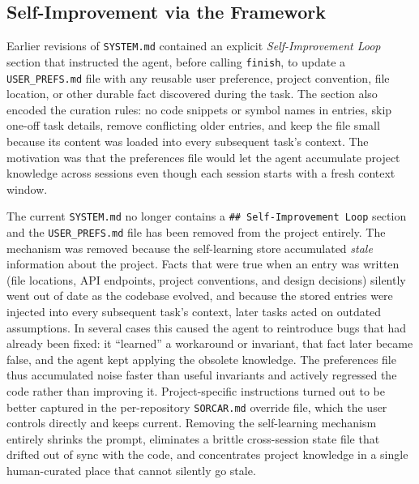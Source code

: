 \documentclass{article}
\begin{document}
\subsection{Self-Improvement via the Framework}
\label{sec:self-improvement-prompt}

Earlier revisions of \texttt{SYSTEM.md} contained an explicit \emph{Self-Improvement Loop} section that instructed the agent, before calling \texttt{finish}, to update a \texttt{USER\_PREFS.md} file with any reusable user preference, project convention, file location, or other durable fact discovered during the task.  The section also encoded the curation rules: no code snippets or symbol names in entries, skip one-off task details, remove conflicting older entries, and keep the file small because its content was loaded into every subsequent task's context.  The motivation was that the preferences file would let the agent accumulate project knowledge across sessions even though each session starts with a fresh context window.

The current \texttt{SYSTEM.md} no longer contains a \texttt{\#\# Self-Improvement Loop} section and the \texttt{USER\_PREFS.md} file has been removed from the project entirely.  The mechanism was removed because the self-learning store accumulated \emph{stale} information about the project.  Facts that were true when an entry was written (file locations, API endpoints, project conventions, and design decisions) silently went out of date as the codebase evolved, and because the stored entries were injected into every subsequent task's context, later tasks acted on outdated assumptions.  In several cases this caused the agent to reintroduce bugs that had already been fixed: it ``learned'' a workaround or invariant, that fact later became false, and the agent kept applying the obsolete knowledge.  The preferences file thus accumulated noise faster than useful invariants and actively regressed the code rather than improving it.  Project-specific instructions turned out to be better captured in the per-repository \texttt{SORCAR.md} override file, which the user controls directly and keeps current.  Removing the self-learning mechanism entirely shrinks the prompt, eliminates a brittle cross-session state file that drifted out of sync with the code, and concentrates project knowledge in a single human-curated place that cannot silently go stale.
\end{document}
